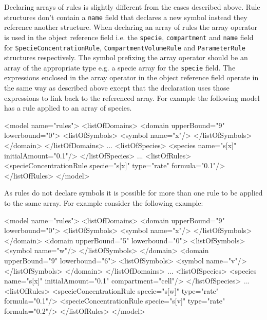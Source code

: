 \documentclass{cekarticle}
\begin{document}
Declaring arrays of rules is slightly different from the cases
described above. Rule structures don't contain a \texttt{name}
field that declares a new symbol instead they reference another
structure.  When declaring an array of rules the array operator
is used in the object reference field i.e. the \texttt{specie},
\texttt{compartment} and \texttt{name} field for
\texttt{SpecieConcentrationRule}, \texttt{CompartmentVolumeRule}
and \texttt{ParameterRule} structures respectively. The symbol
prefixing the array operator should be an array of the appropriate
type e.g. a specie array for the \texttt{specie} field.  The
expressions enclosed in the array operator in the object
reference field operate in the same way as described above except
that the declaration uses those expressions to link back to the
referenced array.  For example the following model has a rule
applied to an array of species.

\begin{example}
<model name="rules">
    <listOfDomains>
        <domain upperBound="9" lowerbound="0">
            <listOfSymbols>
                <symbol name="x"/>
            </listOfSymbols>
        </domain>
    </listOfDomains>
    ...
    <listOfSpecies>
        <species name="s[x]" initialAmount="0.1"/>
    </listOfSpecies>
    ...
    <listOfRules>
        <specieConcentrationRule specie="s[x]" type="rate" formula="0.1"/>
    </listOfRules>
</model>
\end{example}

As rules do not declare symbols it is possible for more than one
rule to be applied to the same array. For example consider the
following example:

\begin{example}
<model name="rules">
    <listOfDomains>
        <domain upperBound="9" lowerbound="0">
            <listOfSymbols>
                <symbol name="x"/>
            </listOfSymbols>
        </domain>
        <domain upperBound="5" lowerbound="0">
            <listOfSymbols>
                <symbol name="w"/>
            </listOfSymbols>
        </domain>
        <domain upperBound="9" lowerbound="6">
            <listOfSymbols>
                <symbol name="v"/>
            </listOfSymbols>
        </domain>
    </listOfDomains>
    ...
    <listOfSpecies>
        <species name="s[x]" initialAmount="0.1" compartment="cell"/>
    </listOfSpecies>
    ...
    <listOfRules>
        <specieConcentrationRule specie="s[w]" type="rate" formula="0.1"/>
        <specieConcentrationRule specie="s[v]" type="rate" formula="0.2"/>
    </listOfRules>
</model>
\end{example}
\end{document}
